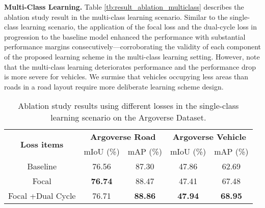\textbf{Multi-Class Learning.}
Table \ref{tb:result_ablation_multiclass} describes the ablation study result in the multi-class learning scenario. Similar to the single-class learning scenario, the application of the focal loss and the dual-cycle loss in progression to the baseline model enhanced the performance with substantial performance margins consecutively---corroborating the validity of each component of the proposed learning scheme in the multi-class learning setting. However, note that the multi-class learning deteriorates performance and the performance drop is more severe for vehicles. We surmise that vehicles occupying less areas than roads in a road layout require more deliberate learning scheme design.



\begin{table}[!t]
\caption{Ablation study results using different losses in the single-class learning scenario on the Argoverse Dataset.}
\label{tb:result_ablation_singleclass}
\begin{center}
\begin{footnotesize}
\begin{tabular}{ccccc}
\toprule
\multicolumn{1}{c}{\multirow{2}[2]{*}{\textbf{Loss items}}} & \multicolumn{2}{c}{\textbf{Argoverse Road}} & \multicolumn{2}{c}{\textbf{Argoverse Vehicle}} \\ 
\cmidrule(lr){2-5}
 & mIoU (\%) & mAP (\%) & mIoU (\%) & mAP (\%)  \\

\midrule
Baseline & 76.56& 87.30 & 47.86 & 62.69 \\ 
\midrule
Focal &\textbf{76.74} &88.47  & 47.41 & 67.48\\ 
Focal +Dual Cycle &76.71&\textbf{88.86}&\textbf{47.94}&\textbf{68.95}\\
\bottomrule
\end{tabular}
\end{footnotesize}
\end{center}
\end{table}


